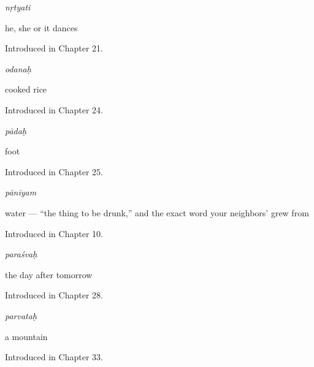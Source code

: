 \noindent\begin{minipage}[t]{\linewidth}
\raggedright
\textbf{}\enspace\emph{nṛtyati}\par
\small he, she or it dances\par
\footnotesize Introduced in Chapter 21.
\end{minipage}\par\medskip

\noindent\begin{minipage}[t]{\linewidth}
\raggedright
\textbf{}\enspace\emph{odanaḥ}\par
\small cooked rice\par
\footnotesize Introduced in Chapter 24.
\end{minipage}\par\medskip

\noindent\begin{minipage}[t]{\linewidth}
\raggedright
\textbf{}\enspace\emph{pādaḥ}\par
\small foot\par
\footnotesize Introduced in Chapter 25.
\end{minipage}\par\medskip

\noindent\begin{minipage}[t]{\linewidth}
\raggedright
\textbf{}\enspace\emph{pānīyam}\par
\small water — \textquotedblleft{}the thing to be drunk,\textquotedblright{} and the exact word your neighbors'  grew from\par
\footnotesize Introduced in Chapter 10.
\end{minipage}\par\medskip

\noindent\begin{minipage}[t]{\linewidth}
\raggedright
\textbf{}\enspace\emph{paraśvaḥ}\par
\small the day after tomorrow\par
\footnotesize Introduced in Chapter 28.
\end{minipage}\par\medskip

\noindent\begin{minipage}[t]{\linewidth}
\raggedright
\textbf{}\enspace\emph{parvataḥ}\par
\small a mountain\par
\footnotesize Introduced in Chapter 33.
\end{minipage}\par\medskip

